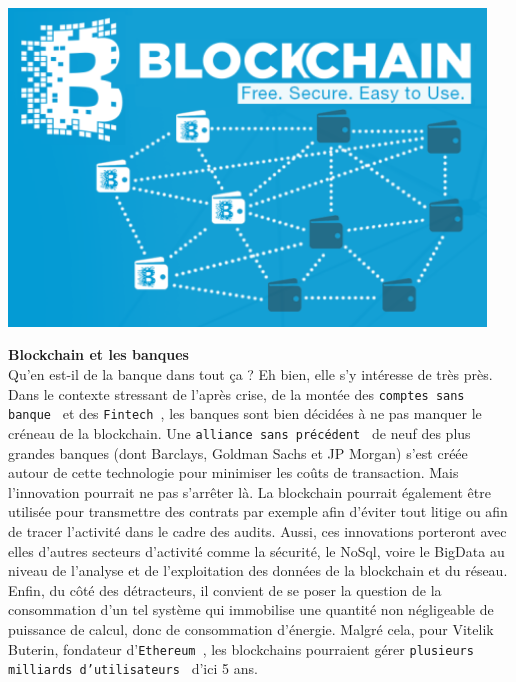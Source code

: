 \documentclass[11pt,twoside,a4paper]{article}
\begin{document}
\begin{minipage}[h]{0.24\textwidth}
	\includegraphics[width=0.95\textwidth]{img/d2si_blog_image_blockchain_wallet.png}
\end{minipage} \hfill \begin{minipage}[h]{0.75\textwidth}
	\textbf{Blockchain et les banques}~\\

	Qu'en est-il de la banque dans tout \c{c}a ? Eh bien, elle s'y int{\'e}resse de tr{\`e}s pr{\`e}s. Dans le contexte stressant de l'apr{\`e}s crise, de la mont{\'e}e des \texttt{comptes sans banque~\footnotemark} et des \texttt{Fintech~\footnotemark}, les banques  sont bien d{\'e}cid{\'e}es {\`a} ne pas manquer le cr{\'e}neau de la blockchain. Une \texttt{alliance sans pr{\'e}c{\'e}dent~\footnotemark} de neuf des plus grandes banques (dont Barclays, Goldman Sachs et JP Morgan) s'est cr{\'e}{\'e}e autour de cette technologie pour minimiser les co{\^u}ts de transaction. Mais l'innovation pourrait ne pas s'arr{\^e}ter l{\`a}. La blockchain pourrait {\'e}galement {\^e}tre utilis{\'e}e pour transmettre des contrats par exemple afin d'{\'e}viter tout litige ou afin de tracer l'activit{\'e} dans le cadre des audits. Aussi, ces innovations porteront avec elles d'autres secteurs d'activit{\'e} comme la s{\'e}curit{\'e}, le NoSql, voire le BigData au niveau de l'analyse et de l'exploitation des donn{\'e}es de la blockchain et du r{\'e}seau. Enfin, du c{\^o}t{\'e} des d{\'e}tracteurs, il convient de se poser la question de la consommation d'un tel syst{\`e}me qui immobilise une quantit{\'e} non n{\'e}gligeable de puissance de calcul, donc de consommation d'{\'e}nergie. Malgr{\'e} cela, pour Vitelik Buterin, fondateur d'\texttt{Ethereum~\footnotemark}, les blockchains pourraient g{\'e}rer \texttt{plusieurs milliards d'utilisateurs~\footnotemark} d'ici 5 ans.~\\
\end{minipage}
\end{document}
